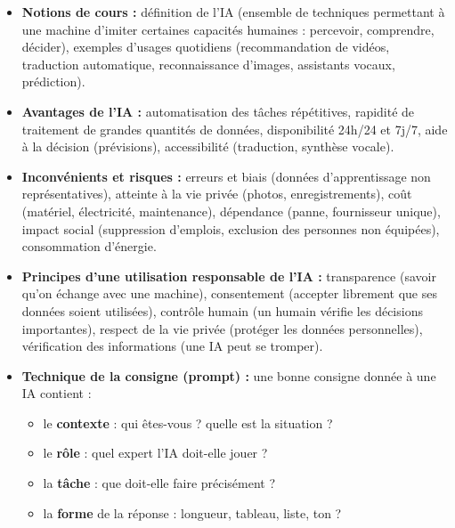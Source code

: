 \documentclass[11pt]{article}
\newcommand{\cle}[1]{{\popxbold\color{popdark}#1}}
\newcounter{popsec}
\newcounter{popsub}
\newcommand{\courssub}[1]{%
  \stepcounter{popsub}%
  \par\vspace{9pt}\noindent{\popxbold\fontsize{11.5}{13}\selectfont\color{popink}{\color{poporange}\thepopsec.\thepopsub}\hspace{6pt}#1}\par\nopagebreak\vspace{4pt}
}
\begin{document}
\courssub{Ressources à mobiliser}
\begin{itemize}
    \item \textbf{Notions de cours :} définition de l'IA (ensemble de techniques permettant à une machine d'imiter certaines capacités humaines : percevoir, comprendre, décider), exemples d'usages quotidiens (recommandation de vidéos, traduction automatique, reconnaissance d'images, assistants vocaux, prédiction).
    \item \textbf{Avantages de l'IA :} automatisation des tâches répétitives, rapidité de traitement de grandes quantités de données, disponibilité 24h/24 et 7j/7, aide à la décision (prévisions), accessibilité (traduction, synthèse vocale).
    \item \textbf{Inconvénients et risques :} \cle{erreurs} et \cle{biais} (données d'apprentissage non représentatives), \cle{atteinte à la vie privée} (photos, enregistrements), \cle{coût} (matériel, électricité, maintenance), \cle{dépendance} (panne, fournisseur unique), \cle{impact social} (suppression d'emplois, exclusion des personnes non équipées), \cle{consommation d'énergie}.
    \item \textbf{Principes d'une utilisation responsable de l'IA :} \cle{transparence} (savoir qu'on échange avec une machine), \cle{consentement} (accepter librement que ses données soient utilisées), \cle{contrôle humain} (un humain vérifie les décisions importantes), \cle{respect de la vie privée} (protéger les données personnelles), \cle{vérification des informations} (une IA peut se tromper).
    \item \textbf{Technique de la consigne (prompt) :} une bonne consigne donnée à une IA contient :
    \begin{itemize}
        \item le \textbf{contexte} : qui êtes-vous ? quelle est la situation ?
        \item le \textbf{rôle} : quel expert l'IA doit-elle jouer ?
        \item la \textbf{tâche} : que doit-elle faire précisément ?
        \item la \textbf{forme} de la réponse : longueur, tableau, liste, ton ?
    \end{itemize}
\end{itemize}
\end{document}
